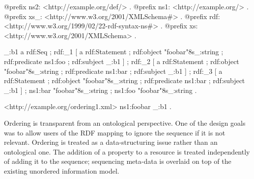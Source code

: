 \begin{DoxyCodeInclude}
@prefix ns2:     <http://example.org/def/> .
@prefix ns1:     <http://example.org/> .
@prefix xs_:     <http://www.w3.org/2001/XMLSchema#> .
@prefix rdf:     <http://www.w3.org/1999/02/22-rdf-syntax-ns#> .
@prefix xs:      <http://www.w3.org/2001/XMLSchema> .

_:b1  a       rdf:Seq ;
      rdf:_1  [ a       rdf:Statement ;
                rdf:object "foobar"^^xs_:string ;
                rdf:predicate ns1:foo ;
                rdf:subject _:b1
              ] ;
      rdf:_2  [ a       rdf:Statement ;
                rdf:object "foobar"^^xs_:string ;
                rdf:predicate ns1:bar ;
                rdf:subject _:b1
              ] ;
      rdf:_3  [ a       rdf:Statement ;
                rdf:object "foobar"^^xs_:string ;
                rdf:predicate ns1:bar ;
                rdf:subject _:b1
              ] ;
      ns1:bar "foobar"^^xs_:string ;
      ns1:foo "foobar"^^xs_:string .

<http://example.org/ordering1.xml>
      ns1:foobar _:b1 .
\end{DoxyCodeInclude}


Ordering is transparent from an ontological perspective. One of the design goals was to allow users of the RDF mapping to ignore the sequence if it is not relevant. Ordering is treated as a data-\/structuring issue rather than an ontological one. The addition of a property to a resource is treated independently of adding it to the sequence; sequencing meta-\/data is overlaid on top of the existing unordered information model. 